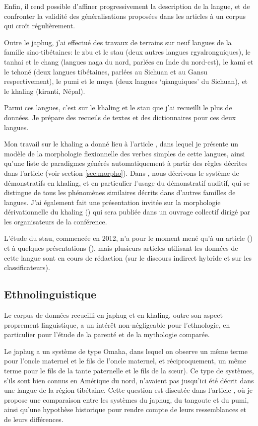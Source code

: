 \documentclass[oldfontcommands,oneside,a4paper,11pt]{article}
\begin{document}
 Enfin, il rend possible d'affiner progressivement la description de la langue, et de confronter la validité des généralisations proposées dans les articles à un corpus qui croît régulièrement. 

Outre le japhug, j'ai effectué des travaux de terrains sur neuf langues de la famille sino-tibétaines: le zbu et le stau (deux autres langues rgyalronguiques), le tanhai et le chang (langues naga du nord, parlées en Inde du nord-est), le kami et le tchoné (deux langues tibétaines, parlées au Sichuan et au Gansu respectivement), le pumi et le muya (deux langues `qianguiques' du Sichuan), et le khaling (kiranti, Népal).

Parmi ces langues, c'est sur le khaling et le stau que j'ai recueilli le plus de données. Je prépare des recueils de textes et des  dictionnaires pour ces deux langues.

Mon travail sur le khaling a donné lieu à l'article \citet{jacques12khaling}, dans lequel je présente un modèle de la morphologie flexionnelle des verbes simples de cette langues, ainsi qu'une liste de paradigmes générés automatiquement à partir des règles décrites dans l'article (voir section \ref{sec:morpho}). Dans \citet{jacques14auditory}, nous décrivons le système de démonstratifs en khaling, et en particulier l'usage du démonstratif auditif, qui se distingue de tous les phénomènes similaires décrits dans d'autres familles de langues. J'ai également fait une présentation invitée sur la morphologie dérivationnelle du khaling (\citealt{jacques13derivational.khaling}) qui sera publiée dans un ouvrage collectif dirigé par les organisateurs de la conférence.

L'étude du stau, commencée en 2012, n'a pour le moment mené qu'à un article (\citealt{jacques14rtau}) et à quelques présentations (\citealt{antonov14rtau}), mais plusieurs articles utilisant les données de cette langue sont en cours de rédaction (sur le discours indirect hybride et sur les classificateurs).
 
\subsection{Ethnolinguistique}  \label{sec:ethno}
Le corpus de données recueilli en japhug et en khaling, outre son aspect proprement linguistique, a un intérêt non-négligeable pour l'ethnologie, en particulier pour l'étude de la parenté et de la mythologie comparée.

Le japhug a un système de type Omaha, dans lequel on observe un même terme pour l'oncle maternel et le fils de l'oncle maternel, et réciproquement, un même terme pour le fils de la tante paternelle et le fils de la sœur). Ce type de systèmes, s'ils sont bien connus en Amérique du nord, n'avaient pas jusqu'ici   été décrit dans une langue de la région tibétaine. Cette question est discutée dans l'article \citet{jacques11kinship}, où je propose une comparaison entre les systèmes du japhug, du tangoute et du pumi, ainsi qu'une hypothèse historique pour rendre compte de leurs ressemblances et de leurs différences.
\end{document}
